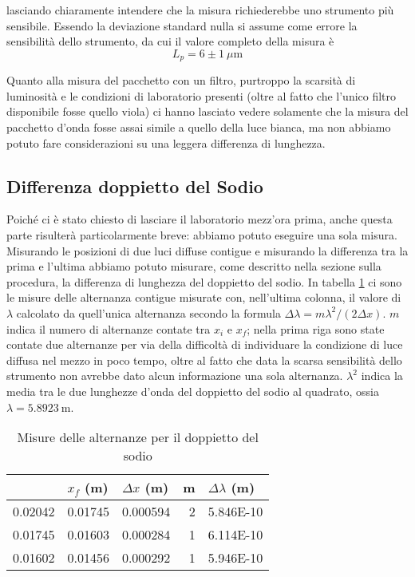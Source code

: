 \documentclass[a4paper,11pt]{article}
\begin{document}
	lasciando chiaramente intendere che la misura richiederebbe uno strumento più sensibile. Essendo la deviazione standard nulla si assume come errore la sensibilità dello strumento, da cui il valore completo della misura è $$L _p = 6 \pm 1 \ \mu \text{m}$$

	Quanto alla misura del pacchetto con un filtro, purtroppo la scarsità di luminosità e le condizioni di laboratorio presenti (oltre al fatto che l'unico filtro disponibile fosse quello viola) ci hanno lasciato vedere solamente che la misura del pacchetto d'onda fosse assai simile a quello della luce bianca, ma non abbiamo potuto fare considerazioni su una leggera differenza di lunghezza.

	\subsection{Differenza doppietto del Sodio}
	
	Poiché ci è stato chiesto di lasciare il laboratorio mezz'ora prima, anche questa parte risulterà particolarmente breve: abbiamo potuto eseguire una sola misura. Misurando le posizioni di due luci diffuse contigue e misurando la differenza tra la prima e l'ultima abbiamo potuto misurare, come descritto nella sezione sulla procedura, la differenza di lunghezza del doppietto del sodio. In tabella \ref{alternanze} ci sono le misure delle alternanza contigue misurate con, nell'ultima colonna, il valore di $\lambda$ calcolato da quell'unica alternanza secondo la formula $\Delta \lambda = m \lambda ^2 / (2 \Delta x)$. $m$ indica il numero di alternanze contate tra $x _i$ e $x_f$; nella prima riga sono state contate due alternanze per via della difficoltà di individuare la condizione di luce diffusa nel mezzo in poco tempo, oltre al fatto che data la scarsa sensibilità dello strumento non avrebbe dato alcun informazione una sola alternanza. $\lambda ^2$ indica la media tra le due lunghezze d'onda del doppietto del sodio al quadrato, ossia $\lambda = \SI{5.8923}{\meter}$.

\begin{table}[htbp]
  \centering
  \caption{Misure delle alternanze per il doppietto del sodio}
    \begin{tabular}{rrrrr}
    \bottomrule
    \rowcolor[rgb]{ .267,  .447,  .769} \multicolumn{1}{l}{\textcolor[rgb]{ 1,  1,  1}{\textbf{$x _i$ (m)}}} & \multicolumn{1}{l}{\textcolor[rgb]{ 1,  1,  1}{\textbf{$x _f$ (m)}}} & \multicolumn{1}{l}{\textcolor[rgb]{ 1,  1,  1}{\textbf{$\Delta x$ (m)}}} & \multicolumn{1}{l}{\textcolor[rgb]{ 1,  1,  1}{\textbf{m}}} & \multicolumn{1}{l}{\textcolor[rgb]{ 1,  1,  1}{\textbf{$\Delta \lambda$ (m)}}} \\
    \toprule
    \rowcolor[rgb]{ .851,  .851,  .851} 0.02042 & 0.01745 & 0.000594 & 2     & 5.846E-10 \\
    0.01745 & 0.01603 & 0.000284 & 1     & 6.114E-10 \\
    \rowcolor[rgb]{ .851,  .851,  .851} 0.01602 & 0.01456 & 0.000292 & 1     & 5.946E-10 \\
    \toprule
    \end{tabular}%
  \label{alternanze}%
\end{table}%
\end{document}
